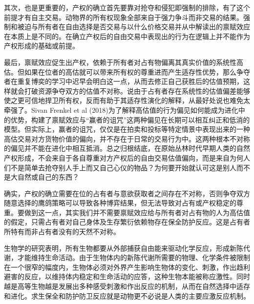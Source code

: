 \documentclass[lang=cn,12pt,a4paper]{elegantpaper}
\begin{document}
其次，也是更重要的，产权的确立首先要靠对抢夺和侵犯即强制的排除，有了这个前提才有自主交易。动物界的所有权现象全部来自于强力争斗而非交易的结果。强制和被迫与所有者在自由选择是否交易与以什么价格交易并从中解读出的禀赋效应在本质上是不同的。在确立产权后的自由交易中表现出的行为在逻辑上并不能作为产权形成的基础或前提。

最后，禀赋效应促生出产权，依赖于所有者对占有物偏离其真实价值的系统性高估。但如果在位者的高估就可以带来所有权的尊重进而产生适存性优势，那么争夺者在重复博奕的学习中迟早会明白这一点，从而去修正自己获胜后的估值预期，这样就会打破资源争夺双方的估值不对称。说由于占有者存在系统性的估值偏差能够使之更可信地捍卫所有权，反而有助于其适存性演化的解释，从最好处说也难免太牵强了。Sivan Frenkel et al (2018)为了解释高估值的行为偏见如何能成为进化中的优势，构建了禀赋效应与``赢者的诅咒''这两种偏见在长期可以相互纠正和低消的模型。但实际上，赢者的诅咒，仅仅是在拍卖和投标等特定情景中表现出来的一种高估交易对方货物价值的偏向，并不存在于日常的交易行为中。这两种根本不对称的偏见并不能在进化中相互抵消。总之归根结底，在原始丛林时代早期人类的自然产权形成，不会来自于各自尊重对方产权后的自由交易估值偏向，而是来自为何人们不是简单去抢夺别人手上而又自己心仪的物品？为何要开始就认可这是别人而不是大自然或自己的东西？

确实，产权的确立需要在位的占有者与意欲获取者之间存在不对称，否则争夺双方随意选择的鹰鸽策略可以导致各种博弈结果，但无法导致对占有或产权稳定的尊重。要做到这一点，其实我们并不需要禀赋效应给与所有者对占有物的人为高估值的假定，只需占有者对自己身体及生存繁衍依赖物存在保全防护反应。这是占有者所特有而非占有者没有的天然不对称。

生物学的研究表明，所有生物都要从外部捕获自由能来驱动化学反应，形成新陈代谢，才能维持生命活动。由于生物体内的新陈代谢所需要的物理、化学条件被限制在一个很窄的幅度内，生物体必须对外界产生影响生物体的变化、刺激，作出趋利避害的反应，以维持体内稳定和生命活动的应答，这种生物本能被称应激性。同时越是高等生物越是发展出多种感受刺激和作出反应的机制，从而在自然选择中适存和进化。求生保全和防护防卫反应就是动物更不必说是人类的主要应激反应机制。
\end{document}
